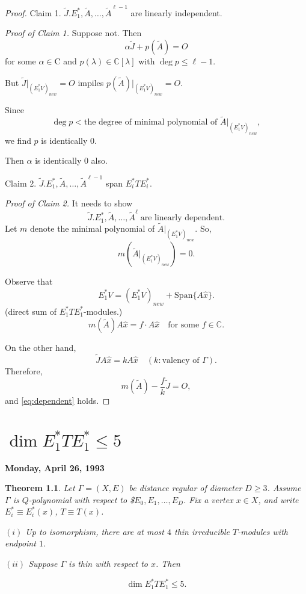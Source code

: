 \documentclass[
]{book}
\newtheorem{theorem}{Theorem}[chapter]
\theoremstyle{definition}
\theoremstyle{definition}
\theoremstyle{definition}
\theoremstyle{definition}
\theoremstyle{remark}
\begin{document}
\begin{proof}
Claim 1. \(\tilde{J}. E^*_1, \tilde{A}, \ldots, \tilde{A}^{\ell-1}\) are linearly independent.

\emph{Proof of Claim 1.}
Suppose not. Then
\[\alpha \tilde{J} + p(\tilde{A}) = O\]
for some \(\alpha\in \mathrm{C}\) and \(p(\lambda)\in \mathbb{C}[\lambda]\) with \(\deg p \leq \ell -1\).

But \(\tilde{J}|_{(E^*_1V)_{new}} = O\) impiles \(p(\tilde{A})|_{(E^*_1V)_{new}}=O\).

Since
\[\deg p < \text{the degree of minimal polynomial of $\tilde{A}|_{(E^*_1V)_{new}}$},\]
we find \(p\) is identically \(0\).

Then \(\alpha\) is identically \(0\) also.

Claim 2. \(\tilde{J}. E^*_1, \tilde{A}, \ldots, \tilde{A}^{\ell-1}\) span \(E^*_iTE^*_i\).

\emph{Proof of Claim 2.}
It needs to show
\begin{equation}
\tilde{J}. E^*_1, \tilde{A}, \ldots, \tilde{A}^{\ell} \; \text{are linearly dependent}.\label{eq:dependent}
\end{equation}
Let \(m\) denote the minimal polynomial of \(\tilde{A}|_{(E^*_1V)_{new}}\). So,
\[m(\tilde{A}|_{(E^*_1V)_{new}}) = 0.\]

Observe that
\[E^*_1V = (E^*_1V)_{new} + \mathrm{Span}\{A\hat{x}\}.\]
(direct sum of \(E^*_1TE^*_1\)-modules.)
\[m(\tilde{A})A\hat{x} = f\cdot A\hat{x}\quad \text{for some }f\in \mathbb{C}.\]

On the other hand,
\[\tilde{J}A\hat{x} = kA\hat{x} \quad (k: \text{valency of }\Gamma).\]
Therefore,
\[m(\tilde{A}) - \frac{f}{k}\tilde{J} = O,\]
and \eqref{eq:dependent} holds.

\end{proof}

\hypertarget{lec35}{%
\chapter{\texorpdfstring{\(\dim E^*_1TE^*_1 \leq 5\)}{\textbackslash dim E\^{}*\_1TE\^{}*\_1 \textbackslash leq 5}}\label{lec35}}

\textbf{Monday, April 26, 1993}

\begin{theorem}
\protect\hypertarget{thm:dim5}{}\label{thm:dim5}Let \(\Gamma = (X, E)\) be distance regular of diameter \(D\geq 3\).
Assume \(\Gamma\) is \(Q\)-polynomial with respect to
\$\(E_0, E_1, \ldots, E_D\).
Fix a vertex \(x\in X\), and write \(E^*_i\equiv E^*_i(x)\), \(T\equiv T(x)\).

\((i)\) Up to isomorphism, there are at most \(4\) thin irreducible \(T\)-modules with endpoint \(1\).

\((ii)\) Suppose \(\Gamma\) is thin with respect to \(x\). Then

\[\dim E^*_1TE^*_1 \leq 5.\]
\end{theorem}
\end{document}
